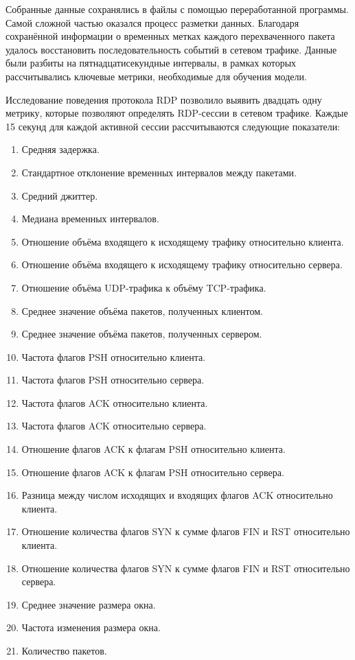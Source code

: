\documentclass[spec, och, diploma]{SCWorks}
\begin{document}
Собранные данные сохранялись в файлы с помощью переработанной программы. Самой сложной частью оказался процесс разметки данных. Благодаря сохранённой 
информации о временных метках каждого перехваченного пакета удалось восстановить последовательность событий в сетевом трафике. Данные были разбиты на 
пятнадцатисекундные интервалы, в рамках которых рассчитывались ключевые метрики, необходимые для обучения модели.  

Исследование поведения протокола RDP позволило выявить двадцать одну метрику, которые позволяют определять RDP-сессии в сетевом трафике.
Каждые 15 секунд для каждой активной сессии рассчитываются следующие показатели:

\begin{enumerate}
  \item Средняя задержка.
  \item Стандартное отклонение временных интервалов между пакетами.
  \item Средний джиттер.
  \item Медиана временных интервалов.
  \item Отношение объёма входящего к исходящему трафику относительно клиента.
  \item Отношение объёма входящего к исходящему трафику относительно сервера.
  \item Отношение объёма UDP-трафика к объёму TCP-трафика.
  \item Среднее значение объёма пакетов, полученных клиентом.
  \item Среднее значение объёма пакетов, полученных сервером.
  \item Частота флагов PSH относительно клиента.
  \item Частота флагов PSH относительно сервера.
  \item Частота флагов ACK относительно клиента.
  \item Частота флагов ACK относительно сервера.
  \item Отношение флагов ACK к флагам PSH относительно клиента.
  \item Отношение флагов ACK к флагам PSH относительно сервера.
  \item Разница между числом исходящих и входящих флагов ACK относительно клиента.
  \item Отношение количества флагов SYN к сумме флагов FIN и RST относительно клиента.
  \item Отношение количества флагов SYN к сумме флагов FIN и RST относительно сервера.
  \item Среднее значение размера окна.
  \item Частота изменения размера окна.
  \item Количество пакетов.
\end{enumerate}
\end{document}
